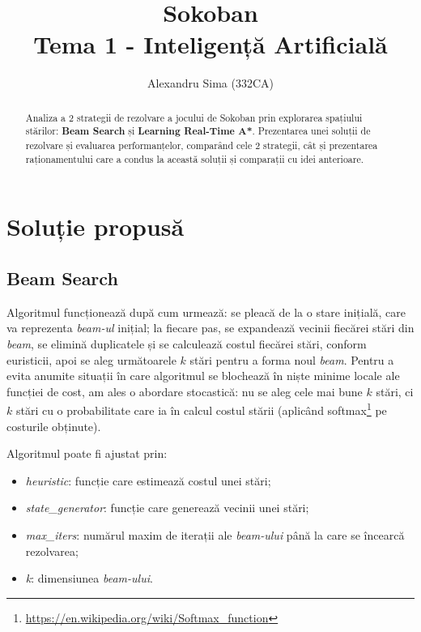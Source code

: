 \documentclass{article}
\title{Sokoban\\Tema 1 - Inteligență Artificială}
\author{Alexandru Sima (332CA)}
\begin{document}
\maketitle
\begin{abstract}
    Analiza a 2 strategii de rezolvare a jocului de Sokoban prin explorarea 
    spațiului stărilor: \textbf{Beam Search} și \textbf{Learning Real-Time A*}. 
    Prezentarea unei soluții de rezolvare și evaluarea performanțelor, comparând
    cele 2 strategii, cât și prezentarea raționamentului care a condus la 
    această soluții și comparații cu idei anterioare.
\end{abstract}

\newpage
\tableofcontents

\newpage
\section{Soluție propusă}

\subsection{Beam Search}
Algoritmul funcționează după cum urmează: se pleacă de la o stare inițială,
care va reprezenta \textit{beam-ul} inițial; la fiecare pas, se expandează 
vecinii fiecărei stări din \textit{beam}, se elimină duplicatele și se 
calculează costul fiecărei stări, conform euristicii, apoi se aleg următoarele 
$k$ stări pentru a forma noul \textit{beam}. Pentru a evita anumite situații
în care algoritmul se blochează în niște minime locale ale funcției de cost, 
am ales o abordare stocastică: nu se aleg cele mai bune $k$ stări, ci $k$ stări 
cu o probabilitate care ia în calcul costul stării (aplicând 
softmax\footnote{\url{https://en.wikipedia.org/wiki/Softmax_function}} pe 
costurile obținute).

Algoritmul poate fi ajustat prin:
\begin{itemize}
    \item \textit{heuristic}: funcție care estimează costul unei stări;
    \item \textit{state\_generator}: funcție care generează vecinii unei stări;
    \item \textit{max\_iters}: numărul maxim de iterații ale \textit{beam-ului}
    până la care se încearcă rezolvarea;
    \item \textit{k}: dimensiunea \textit{beam-ului}.    
\end{itemize}
\end{document}
